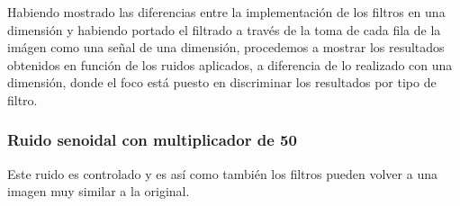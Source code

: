 Habiendo mostrado las diferencias entre la implementaci\'on de los filtros en
una dimensi\'on y habiendo portado el filtrado a trav\'es de la toma de cada
fila de la im\'agen como una se\~nal de una dimensi\'on, procedemos a mostrar
los resultados obtenidos en funci\'on de los ruidos aplicados, a diferencia de
lo realizado con una dimensi\'on, donde el foco est\'a puesto en discriminar los
resultados por tipo de filtro.

\subsubsection{Ruido senoidal con multiplicador de 50}

Este ruido es controlado y es as\'i como tambi\'en los filtros pueden volver a
una imagen muy similar a la original.

